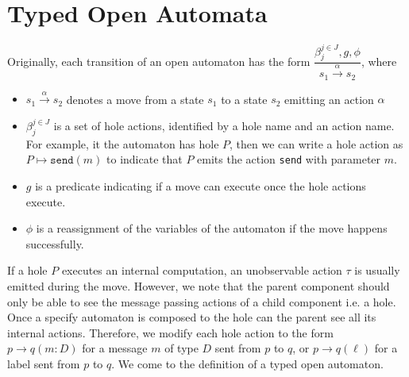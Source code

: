 \section{Typed Open Automata}
Originally, each transition of an open automaton has the form $\dfrac{\beta_j^{j\in J},g,\phi}{s_1\xrightarrow{\alpha} s_2}$, where
\begin{itemize}
  \item $s_1\xrightarrow{\alpha} s_2$ denotes a move from a state $s_1$ to a state $s_2$ emitting an action $\alpha$
  \item $\beta_j^{j\in J}$ is a set of hole actions, identified by a hole name and an action name. For example, it the automaton has hole $P$, then we can write a hole action as $P\mapsto \texttt{send}(m)$ to indicate that $P$ emits the action \texttt{send} with parameter $m$.
  \item $g$ is a predicate indicating if a move can execute once the hole actions execute.
  \item $\phi$ is a reassignment of the variables of the automaton if the move happens successfully.
\end{itemize}

If a hole $P$ executes an internal computation, an unobservable action $\tau$ is usually emitted during the move. However, we note that the parent component should only be able to see the message passing actions of a child component i.e. a hole. Once a specify automaton is composed to the hole can the parent see all its internal actions. Therefore, we modify each hole action to the form $p\to q(m : D)$ for a message $m$ of type $D$ sent from $p$ to $q$, or $p\to q(\ell)$ for a label sent from $p$ to $q$. We come to the definition of a typed open automaton.

